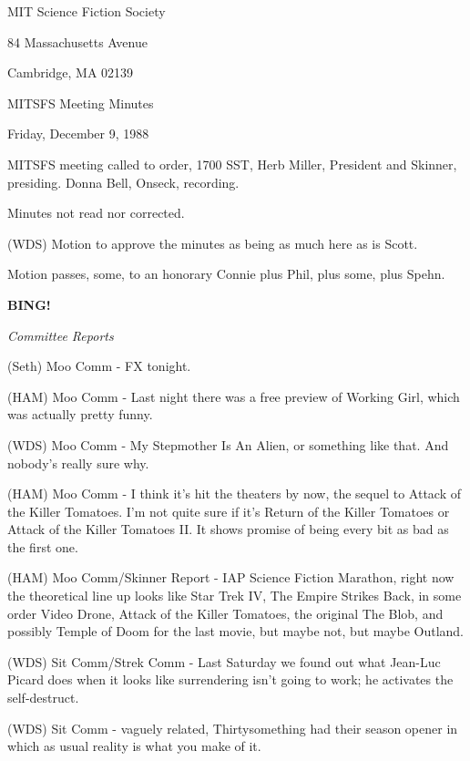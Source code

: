 \documentclass[12pt]{article}
\newcommand{\bing}{{\bf BING!} }
\newcommand{\goto}[1]{\bing \vskip 12pt \centerline{{\em{#1}}}}
\begin{document}
\begin{center}

MIT Science Fiction Society 

84 Massachusetts Avenue

Cambridge, MA 02139

\vspace{12pt}

MITSFS Meeting Minutes 

Friday, December 9, 1988

\end{center}
 
\vspace{18pt}

\setlength{\parskip}{6pt}

\noindent
MITSFS meeting called to order, 1700 SST, Herb Miller, President and Skinner, presiding. Donna Bell, Onseck, recording.

Minutes not read nor corrected.

(WDS) Motion to approve the minutes as being as much here as is Scott.

Motion passes, some, to an honorary Connie plus Phil, plus some, plus Spehn.

\goto{Committee Reports}

(Seth) Moo Comm - FX tonight.

(HAM) Moo Comm - Last night there was a free preview of Working Girl, which was actually pretty funny.

(WDS) Moo Comm - My Stepmother Is An Alien, or something like that. And nobody's really sure why.

(HAM) Moo Comm - I think it's hit the theaters by now, the sequel to Attack of the Killer Tomatoes. I'm not quite sure if it's Return of the Killer Tomatoes or Attack of the Killer Tomatoes II. It shows promise of being every bit as bad as the first one.

(HAM) Moo Comm/Skinner Report - IAP Science Fiction Marathon, right now the theoretical line up looks like Star Trek IV, The Empire Strikes Back, in some order Video Drone, Attack of the Killer Tomatoes, the original The Blob, and possibly Temple of Doom for the last movie, but maybe not, but maybe Outland.

(WDS) Sit Comm/Strek Comm - Last Saturday we found out what Jean-Luc Picard does when it looks like surrendering isn't going to work; he activates the self-destruct.

(WDS) Sit Comm - vaguely related, Thirtysomething had their season opener in which as usual reality is what you make of it.
\end{document}
